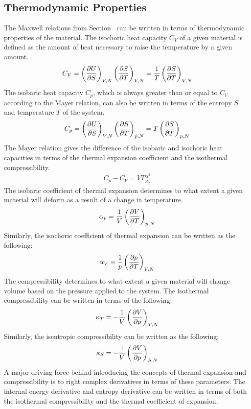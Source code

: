 \subsection{Thermodynamic Properties}\label{thermoprop}
The Maxwell relations from Section~ can be written in terms of thermodynamic properties of the material.  The isochoric heat capacity $C_V$ of a given material is defined as the amount of heat necessary to raise the temperature by a given amount.
\begin{align}
    C_V = \left(\pdv{U}{S}\right )_{V,N}\left( \pdv{S}{T} \right )_{V,N} = \frac{1}{T}\left(\pdv{S}{T}\right )_{V,N}
\end{align}
The isobaric heat capacity $C_p$, which is always greater than or equal to $C_V$ according to the Mayer relation, can also be written in terms of the entropy $S$ and temperature $T$ of the system.
\begin{align}
    C_p = \left(\pdv{U}{S}\right )_{V,N}\left( \pdv{S}{T} \right )_{p,N} = T\left(\pdv{S}{T}\right )_{p,N}
\end{align}
The Mayer relation gives the difference of the isobaric and isochoric heat capacities in terms of the thermal expansion coefficient and the isothermal compressibility.
\begin{align}
    C_p - C_V = VT\frac{\alpha^2}{\kappa_T}
\end{align}
The isobaric coefficient of thermal expansion determines to what extent a given material will deform as a result of a change in temperature.
\begin{align}
    \alpha_p = \frac{1}{V}\left( \pdv{V}{T} \right )_{p,N}
\end{align}
Similarly, the isochoric coefficient of thermal expansion can be written as the following:
\begin{align}
    \alpha_V = \frac{1}{p}\left( \pdv{p}{T} \right )_{V,N}
\end{align}
The compressibility determines to what extent a given material will change volume based on the pressure applied to the system.  The isothermal compressibility can be written in terms of the following:
\begin{align}
    \kappa_T = -\frac{1}{V}\left( \pdv{V}{p} \right )_{T,N}
\end{align}
Similarly, the isentropic compressibility can be written as the following:
\begin{align}
    \kappa_S = -\frac{1}{V}\left( \pdv{V}{p} \right )_{S,N}
\end{align}
A major driving force behind introducing the concepts of thermal expansion and compressibility is to right complex derivatives in terms of these parameters. The internal energy derivative and entropy derivative can be written in terms of both the isothermal compressibility and the thermal coefficient of expansion.
